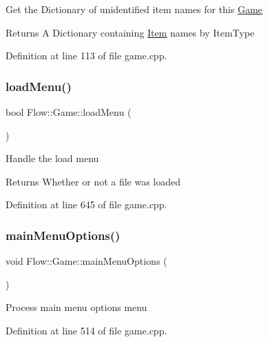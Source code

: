 Get the Dictionary of unidentified item names for this \hyperlink{class_flow_1_1_game}{Game} \begin{DoxyReturn}{Returns}
A Dictionary containing \hyperlink{class_flow_1_1_item}{Item} names by Item\+Type 
\end{DoxyReturn}


Definition at line 113 of file game.\+cpp.

\hypertarget{class_flow_1_1_game_a685c4a00d30acbd2e17ce4244a18f595}{}\label{class_flow_1_1_game_a685c4a00d30acbd2e17ce4244a18f595} 
\subsubsection{\texorpdfstring{load\+Menu()}{loadMenu()}}
{\footnotesize\ttfamily bool Flow\+::\+Game\+::load\+Menu (\begin{DoxyParamCaption}{ }\end{DoxyParamCaption})}

Handle the load menu \begin{DoxyReturn}{Returns}
Whether or not a file was loaded 
\end{DoxyReturn}


Definition at line 645 of file game.\+cpp.

\hypertarget{class_flow_1_1_game_a25c2d490f362ad2b0d4df53eee48602d}{}\label{class_flow_1_1_game_a25c2d490f362ad2b0d4df53eee48602d} 
\subsubsection{\texorpdfstring{main\+Menu\+Options()}{mainMenuOptions()}}
{\footnotesize\ttfamily void Flow\+::\+Game\+::main\+Menu\+Options (\begin{DoxyParamCaption}{ }\end{DoxyParamCaption})}

Process main menu options menu 

Definition at line 514 of file game.\+cpp.

\hypertarget{class_flow_1_1_game_a4adcdf9a6c23065c19af4fae3a0a731f}{}\label{class_flow_1_1_game_a4adcdf9a6c23065c19af4fae3a0a731f} 
